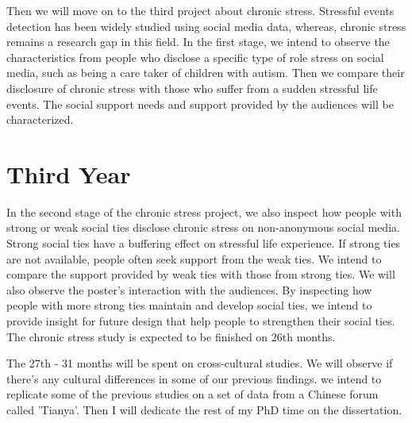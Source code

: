 Then we will move on to the third project about chronic stress. Stressful events detection has been widely studied using social media data, whereas, chronic stress remains a research gap in this field. In the first stage, we intend to observe the characteristics from people who disclose a specific type of role stress on social media, such as being a care taker of children with autism. Then we compare their disclosure of chronic stress with those who suffer from a sudden stressful life events. The social support needs and support provided by the audiences will be characterized.

\section{Third Year}
In the second stage of the chronic stress project, we also inspect how people with strong or weak social ties disclose chronic stress on non-anonymous social media. Strong social ties have a buffering effect on stressful life experience. If strong ties are not available, people often seek support from the weak ties. We intend to compare the support provided by weak ties with those from strong ties. We will also observe the poster's interaction with the audiences. By inspecting how people with more strong ties maintain and develop social ties, we intend to provide insight for future design that help people to strengthen their social ties. The chronic stress study is expected to be finished on 26th months. 

The 27th - 31 months will be spent on cross-cultural studies. We will observe if there's any cultural differences in some of our previous findings. we intend to replicate some of the previous studies on a set of data from a Chinese forum called 'Tianya'. Then I will dedicate the rest of my PhD time on the dissertation. 


